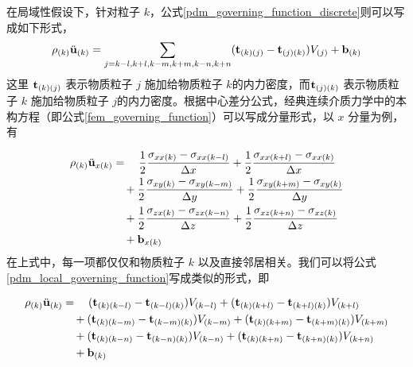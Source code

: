 在局域性假设下，针对粒子 $k$，公式\ref{pdm_governing_function_discrete}则可以写成如下形式，
\begin{equation}
\rho_{(k)}\ddot{\mathbf{u}}_{(k)}
= \sum_{j=k-l,k+l,k-m,k+m,k-n,k+n}(\mathbf{t}_{(k)(j)}-\mathbf{t}_{(j)(k)})V_{(j)} + \mathbf{b}_{(k)}
\label{pdm_local_governing_function}
\end{equation}
这里 $\mathbf{t}_{(k)(j)}$ 表示物质粒子 $j$ 施加给物质粒子 $k$的内力密度，而$\mathbf{t}_{(j)(k)}$ 表示物质粒子 $k$ 施加给物质粒子 $j$的内力密度。根据中心差分公式，经典连续介质力学中的本构方程（即公式\ref{fem_governing_function}）可以写成分量形式，以 $x$ 分量为例，有

\begin{equation}
\begin{aligned}
\rho_{(k)}\ddot{\mathbf{u}}_{x(k)} &= \quad \frac{1}{2}\frac{\sigma_{xx(k)} - \sigma_{xx(k-l)}}{\Delta x} + \frac{1}{2}\frac{\sigma_{xx(k+l)} - \sigma_{xx(k)}}{\Delta x}\\
                              &\quad+  \frac{1}{2}\frac{\sigma_{xy(k)} - \sigma_{xy(k-m)}}{\Delta y} + \frac{1}{2}\frac{\sigma_{xy(k+m)} - \sigma_{xy(k)}}{\Delta y}\\
                              &\quad+  \frac{1}{2}\frac{\sigma_{zx(k)} - \sigma_{zx(k-n)}}{\Delta z} + \frac{1}{2}\frac{\sigma_{xz(k+n)} - \sigma_{xz(k)}}{\Delta z}\\
                              &\quad + \mathbf{b}_{x(k)}
\label{fem_local_governing_function}
\end{aligned}
\end{equation}
在上式中，每一项都仅仅和物质粒子 $k$ 以及直接邻居相关。我们可以将公式\ref{pdm_local_governing_function}写成类似的形式，即

\begin{equation}
\begin{aligned}
\rho_{(k)}\ddot{\mathbf{u}}_{(k)} &= \quad (\mathbf{t}_{(k)(k-l)} - \mathbf{t}_{(k-l)(k)})V_{(k-l)} + (\mathbf{t}_{(k)(k+l)} - \mathbf{t}_{(k+l)(k)})V_{(k+l)}\\
                             &\quad + (\mathbf{t}_{(k)(k-m)} - \mathbf{t}_{(k-m)(k)})V_{(k-m)} + (\mathbf{t}_{(k)(k+m)} - \mathbf{t}_{(k+m)(k)})V_{(k+m)}\\
                             &\quad + (\mathbf{t}_{(k)(k-n)} - \mathbf{t}_{(k-n)(k)})V_{(k-n)} + (\mathbf{t}_{(k)(k+n)} - \mathbf{t}_{(k+n)(k)})V_{(k+n)}\\
                             &\quad  + \mathbf{b}_{(k)}
\label{pdm_local_governing_function_2}
\end{aligned}
\end{equation}

